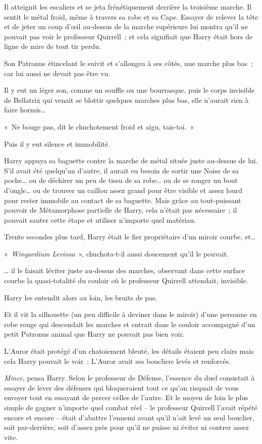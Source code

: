 Il atteignit les escaliers et se jeta frénétiquement derrière la troisième marche. Il sentit le métal froid, même à travers sa robe et sa Cape. Essayer de relever la tête et de jeter un coup d'œil au-dessus de la marche supérieure lui montra qu'il ne pouvait pas voir le professeur Quirrell~; et cela signifiait que Harry était hors de ligne de mire de tout tir perdu.

Son Patronus étincelant le suivit et s'allongea à ses côtés, une marche plus bas~; car lui aussi ne devait pas être vu.

Il y eut un léger son, comme un souffle ou une bourrasque, puis le corps invisible de Bellatrix qui venait se blottir quelques marches plus bas, elle n'aurait rien à faire hormis…

«~Ne bouge pas, dit le chuchotement froid et aigu, tais-toi.~»

Puis il y eut silence et immobilité.

Harry appuya sa baguette contre la marche de métal située juste au-dessus de lui. S'il avait été quelqu'un d'autre, il aurait eu besoin de sortir une Noise de sa poche… ou de déchirer un peu de tissu de sa robe… ou de se ronger un bout d'ongle… ou de trouver un caillou assez grand pour être visible et assez lourd pour rester immobile au contact de sa baguette. Mais grâce au tout-puissant pouvoir de Métamorphose partielle de Harry, cela n'était pas nécessaire~; il pouvait sauter cette étape et utiliser n'importe quel matériau.

Trente secondes plus tard, Harry était le fier propriétaire d'un miroir courbe, et…

«~\emph{Wingardium Leviosa}~», chuchota-t-il aussi doucement qu'il le pouvait.

… il le faisait léviter juste au-dessus des marches, observant dans cette surface courbe la quasi-totalité du couloir où le professeur Quirrell attendait, invisible.

Harry les entendit alors au loin, les bruits de pas.

Et il vit la silhouette (un peu difficile à deviner dans le miroir) d'une personne en robe rouge qui descendait les marches et entrait dans le couloir accompagné d'un petit Patronus animal que Harry ne pouvait pas bien voir.

L'Auror était protégé d'un chatoiement bleuté, les détails étaient peu clairs mais cela Harry pouvait le voir~: L'Auror avait ses boucliers levés et renforcés.

\emph{Mince}, pensa Harry. Selon le professeur de Défense, l'essence du duel consistait à essayer de lever des défenses qui bloqueraient tout ce qu'on risquait de vous envoyer tout en essayant de percer celles de l'autre. Et le moyen de loin le plus simple de gagner n'importe quel combat réel -- le professeur Quirrell l'avait répété encore et encore -- était d'abattre l'ennemi avant qu'il n'ait levé un seul bouclier, soit par-derrière, soit d'assez près pour qu'il ne puisse ni éviter ni contrer assez vite.

